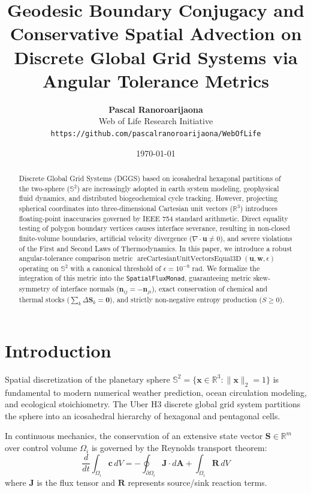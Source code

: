 \documentclass[10pt,twocolumn,letterpaper]{article}
\title{\textbf{Geodesic Boundary Conjugacy and Conservative Spatial Advection on Discrete Global Grid Systems via Angular Tolerance Metrics}}
\author{
  \textbf{Pascal Ranoroarijaona}\\
  Web of Life Research Initiative\\
  \texttt{https://github.com/pascalranoroarijaona/WebOfLife}
}
\date{\today}
\theoremstyle{definition}
\begin{document}
\maketitle

\begin{abstract}
Discrete Global Grid Systems (DGGS) based on icosahedral hexagonal partitions of the two-sphere ($\mathbb{S}^2$) are increasingly adopted in earth system modeling, geophysical fluid dynamics, and distributed biogeochemical cycle tracking. However, projecting spherical coordinates into three-dimensional Cartesian unit vectors ($\mathbb{R}^3$) introduces floating-point inaccuracies governed by IEEE 754 standard arithmetic. Direct equality testing of polygon boundary vertices causes interface severance, resulting in non-closed finite-volume boundaries, artificial velocity divergence ($\nabla \cdot \mathbf{u} \ne 0$), and severe violations of the First and Second Laws of Thermodynamics. In this paper, we introduce a robust angular-tolerance comparison metric $\operatorname{areCartesianUnitVectorsEqual3D}(\mathbf{u}, \mathbf{w}, \epsilon)$ operating on $\mathbb{S}^2$ with a canonical threshold of $\epsilon = 10^{-9}\text{ rad}$. We formalize the integration of this metric into the \texttt{SpatialFluxMonad}, guaranteeing metric skew-symmetry of interface normals ($\mathbf{n}_{ij} = -\mathbf{n}_{ji}$), exact conservation of chemical and thermal stocks ($\sum_k \Delta \mathbf{S}_k = \mathbf{0}$), and strictly non-negative entropy production ($\dot{S} \ge 0$).
\end{abstract}

\section{Introduction}
Spatial discretization of the planetary sphere $\mathbb{S}^2 = \{ \mathbf{x} \in \mathbb{R}^3 : \|\mathbf{x}\|_2 = 1 \}$ is fundamental to modern numerical weather prediction, ocean circulation modeling, and ecological stoichiometry. The Uber H3 discrete global grid system partitions the sphere into an icosahedral hierarchy of hexagonal and pentagonal cells.

In continuous mechanics, the conservation of an extensive state vector $\mathbf{S} \in \mathbb{R}^m$ over control volume $\Omega_i$ is governed by the Reynolds transport theorem:
\begin{equation}
\frac{d}{dt} \int_{\Omega_i} \mathbf{c} \, dV = - \oint_{\partial \Omega_i} \mathbf{J} \cdot d\mathbf{A} + \int_{\Omega_i} \mathbf{R} \, dV
\end{equation}
where $\mathbf{J}$ is the flux tensor and $\mathbf{R}$ represents source/sink reaction terms.
\end{document}
